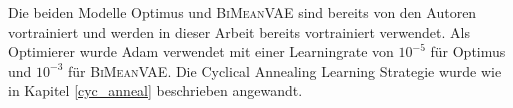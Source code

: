 Die beiden Modelle Optimus und \textsc{BiMeanVAE} sind bereits von den Autoren \citep{coop} vortrainiert und werden in dieser Arbeit bereits vortrainiert verwendet. 
Als Optimierer wurde Adam verwendet mit einer Learningrate von $10^{-5}$ für Optimus und $10^{-3}$ für \textsc{BiMeanVAE}.
Die Cyclical Annealing Learning Strategie wurde wie in Kapitel \ref{cyc_anneal} beschrieben angewandt.


\pagebreak

